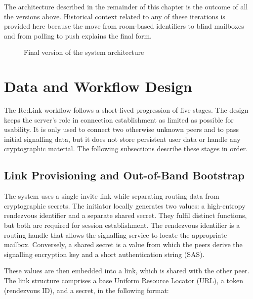 \documentclass[12pt,a4paper,oneside]{report}
\begin{document}
The architecture described in the remainder of this chapter is the outcome of all the versions above. Historical context related to any of these iterations is provided here because the move from room-based identifiers to blind mailboxes and from polling to push explains the final form.

\begin{figure}[htbp]
  \centering
  \caption{Final version of the system architecture}
  \label{fig:final-arch}
\end{figure}


\section{Data and Workflow Design}
\label{sec:data-workflow}

The Re:Link workflow follows a short-lived progression of five stages. The design keeps the server's role in connection establishment as limited as possible for usability. It is only used to connect two otherwise unknown peers and to pass initial signalling data, but it does not store persistent user data or handle any cryptographic material. The following subsections describe these stages in order.


\subsection{Link Provisioning and Out-of-Band Bootstrap}
\label{sec:link-provisioning}

The system uses a single invite link while separating routing data from cryptographic secrets. The initiator locally generates two values: a high-entropy rendezvous identifier and a separate shared secret. They fulfil distinct functions, but both are required for session establishment. The rendezvous identifier is a routing handle that allows the signalling service to locate the appropriate mailbox. Conversely, a shared secret is a value from which the peers derive the signalling encryption key and a short authentication string (SAS).

These values are then embedded into a link, which is shared with the other peer. The link structure comprises a base Uniform Resource Locator (URL), a token (rendezvous ID), and a secret, in the following format:
\end{document}
